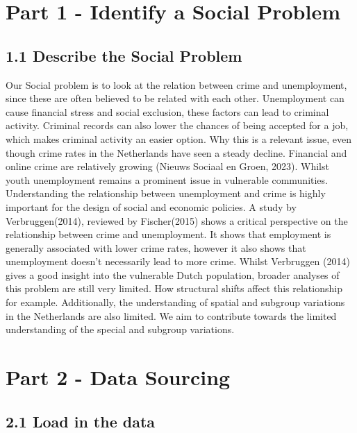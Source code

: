 \documentclass[
]{article}
\begin{document}
\section{Part 1 - Identify a Social
Problem}\label{part-1---identify-a-social-problem}

\subsection{1.1 Describe the Social
Problem}\label{describe-the-social-problem}

Our Social problem is to look at the relation between crime and
unemployment, since these are often believed to be related with each
other. Unemployment can cause financial stress and social exclusion,
these factors can lead to criminal activity. Criminal records can also
lower the chances of being accepted for a job, which makes criminal
activity an easier option. Why this is a relevant issue, even though
crime rates in the Netherlands have seen a steady decline. Financial and
online crime are relatively growing (Nieuws Sociaal en Groen, 2023).
Whilst youth unemployment remains a prominent issue in vulnerable
communities. Understanding the relationship between unemployment and
crime is highly important for the design of social and economic
policies. A study by Verbruggen(2014), reviewed by Fischer(2015) shows a
critical perspective on the relationship between crime and unemployment.
It shows that employment is generally associated with lower crime rates,
however it also shows that unemployment doesn't necessarily lead to more
crime. Whilst Verbruggen (2014) gives a good insight into the vulnerable
Dutch population, broader analyses of this problem are still very
limited. How structural shifts affect this relationship for example.
Additionally, the understanding of spatial and subgroup variations in
the Netherlands are also limited. We aim to contribute towards the
limited understanding of the special and subgroup variations.

\section{Part 2 - Data Sourcing}\label{part-2---data-sourcing}

\subsection{2.1 Load in the data}\label{load-in-the-data}
\end{document}
